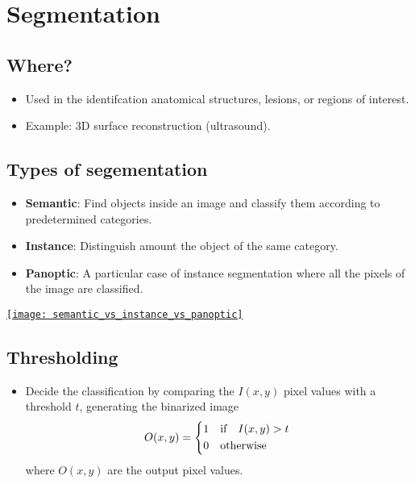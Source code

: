 \chapter{Segmentation}

\section{Where?}
\begin{itemize}
\item Used in the identifcation anatomical structures, lesions, or regions of interest.
\item Example: 3D surface reconstruction (ultrasound).
\end{itemize}
  
\section{Types of segementation}

\begin{itemize}
\item \textbf{Semantic}: Find objects inside an image and classify them according to predetermined categories.
\item \textbf{Instance}: Distinguish amount the object of the same category.
\item \textbf{Panoptic}: A particular case of instance segmentation where all the pixels of the image are classified.
\end{itemize}

\href{https://www.labellerr.com/blog/semantic-vs-instance-vs-panoptic-which-image-segmentation-technique-to-choose/}{\texttt{[image: semantic\_vs\_instance\_vs\_panoptic]}}

\section{Thresholding}
\begin{itemize}
\item Decide the classification by comparing the $I(x,y)$ pixel values with a threshold $t$, generating the binarized image
  \begin{equation}
    O(x,y) = \begin{cases*}
      1 & {\text if}\quad $I(x,y)>t$ \\
      0 & {\text otherwise}
    \end{cases*} 
  \end{equation}
  where $O(x,y)$ are the output pixel values.
\end{itemize}

